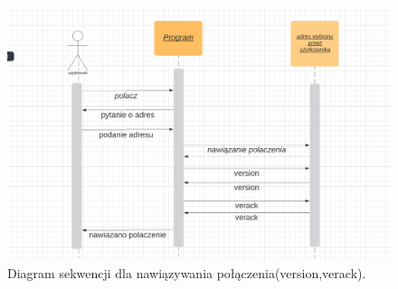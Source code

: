 \begin{figure}

\caption{Diagram sekwencji dla nawiązywania połączenia(version,verack).}
\label{zdj:sek:version}
\centering
\includegraphics[width=\textwidth]{zdjecia/sekwencjiVersion}
\end{figure}
